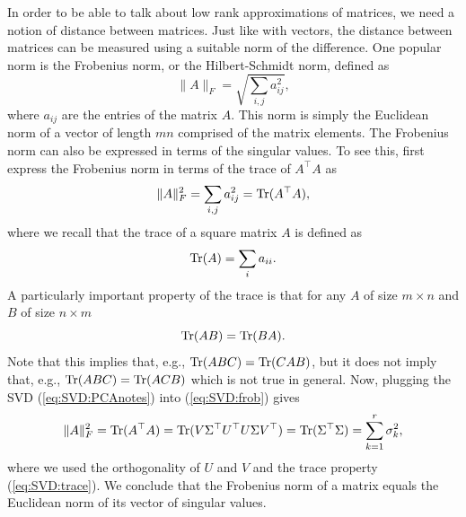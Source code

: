 In order to be able to talk about low rank approximations of matrices, we need a notion of distance between matrices. Just like with vectors, the distance between matrices can be measured using a suitable norm of the difference. One popular norm is the Frobenius norm, or the Hilbert-Schmidt norm, defined as
\begin{equation}
\|A\|_F = \sqrt{\sum_{i,j} a_{ij}^2},
\end{equation}
where $a_{ij}$ are the entries of the matrix $A$. This norm is simply the Euclidean norm of a vector of length $mn$ comprised of the matrix elements. The Frobenius norm can also be expressed in terms of the singular values. To see this, first express the Frobenius norm in terms of the trace of $A^\top   A$ as
\begin{equation}\label{eq:SVD:frob}
\|A\|_F^2 = \sum_{i,j} a_{ij}^2 = \operatorname{Tr}(A^\top   A),
\end{equation}
where we recall that the trace of a square matrix $A$ is defined as
\begin{equation}
\operatorname{Tr}(A) = \sum_{i} a_{ii}.
\end{equation}
A particularly important property of the trace is that for any $A$ of size $m \times n$ and $B$ of size $n\times m$
\begin{equation}\label{eq:SVD:trace}
 \operatorname{Tr}(AB) = \operatorname{Tr}(BA).
\end{equation}
Note that this implies that, e.g., $\operatorname{Tr}(ABC) = \operatorname{Tr}(CAB)$, but it does not imply that, e.g., $\operatorname{Tr}(ABC) = \operatorname{Tr}(ACB)$ which is not true in general.
Now, plugging the SVD (\ref{eq:SVD:PCAnotes}) into (\ref{eq:SVD:frob}) gives
\begin{equation}\label{eq:SVD:MF}
\|A\|_F^2 = \operatorname{Tr}(A^\top   A) = \operatorname{Tr}(V \Sigma^\top   U^\top   U \Sigma V^\top  ) = \operatorname{Tr}(\Sigma^\top   \Sigma) = \sum_{k=1}^r \sigma_k^2,
\end{equation}
where we used the orthogonality of $U$ and $V$ and the trace property (\ref{eq:SVD:trace}). We conclude that the Frobenius norm of a matrix equals the Euclidean norm of its vector of singular values.

